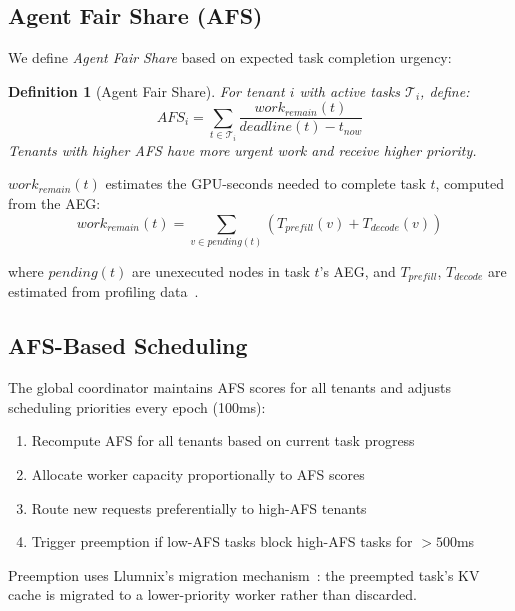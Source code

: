 \documentclass[sigconf]{acmart}
\newtheorem{definition}{Definition}
\begin{document}
\subsection{Agent Fair Share (AFS)}
\label{sec:afs}

We define \emph{Agent Fair Share} based on expected task completion urgency:

\begin{definition}[Agent Fair Share]
For tenant $i$ with active tasks $\mathcal{T}_i$, define:
\begin{equation}
    AFS_i = \sum_{t \in \mathcal{T}_i} \frac{work_{remain}(t)}{deadline(t) - t_{now}}
    \label{eq:afs}
\end{equation}
Tenants with higher AFS have more urgent work and receive higher priority.
\end{definition}

$work_{remain}(t)$ estimates the GPU-seconds needed to complete task $t$, computed from the AEG:
\begin{equation}
    work_{remain}(t) = \sum_{v \in pending(t)} (T_{prefill}(v) + T_{decode}(v))
    \label{eq:work}
\end{equation}

where $pending(t)$ are unexecuted nodes in task $t$'s AEG, and $T_{prefill}$, $T_{decode}$ are estimated from profiling data~\cite{agrawal2024sarathi}.

\subsection{AFS-Based Scheduling}
\label{sec:afs-sched}

The global coordinator maintains AFS scores for all tenants and adjusts scheduling priorities every epoch (100ms):

\begin{enumerate}[leftmargin=*,noitemsep]
    \item Recompute AFS for all tenants based on current task progress
    \item Allocate worker capacity proportionally to AFS scores
    \item Route new requests preferentially to high-AFS tenants
    \item Trigger preemption if low-AFS tasks block high-AFS tasks for $>500$ms
\end{enumerate}

Preemption uses Llumnix's migration mechanism~\cite{sun2024llumnix}: the preempted task's KV cache is migrated to a lower-priority worker rather than discarded.
\end{document}
